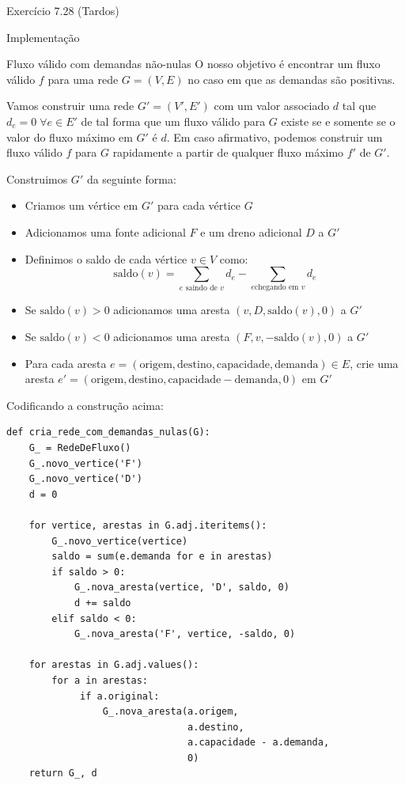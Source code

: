 \documentclass[presentation]{beamer}
\begin{document}
\begin{frame}[fragile,label=sec-2]{Exercício 7.28 (Tardos)}
\begin{block}{Implementação}
\begin{block}{Fluxo válido com demandas não-nulas}
O nosso objetivo é encontrar um fluxo válido $f$ para uma rede $G =
(V, E)$ no caso em que as demandas são positivas.

Vamos construir uma rede $G' = (V', E')$ com um valor associado $d$
tal que $d_e = 0 \; \forall e \in E'$ de tal forma que um fluxo válido
para $G$ existe se e somente se o valor do fluxo máximo em $G'$ é
$d$. Em caso afirmativo, podemos construir um fluxo válido $f$ para
$G$ rapidamente a partir de qualquer fluxo máximo $f'$ de $G'$.

Construimos $G'$ da seguinte forma:

\begin{itemize}
\item Criamos um vértice em $G'$ para cada vértice $G$
\item Adicionamos uma fonte adicional $F$ e um dreno adicional $D$ a $G'$
\item Definimos o saldo de cada vértice $v \in V$ como: \[
  \textrm{saldo}(v) = \sum_{e \text{ saindo de }v}d_e - \sum_{e \text{
  chegando em }v}d_e \]
\item Se $\mathrm{saldo}(v) > 0$ adicionamos uma aresta $(v, D,
  \mathrm{saldo}(v), 0)$ a $G'$
\item Se $\mathrm{saldo}(v) < 0$ adicionamos uma aresta $(F, v,
  -\mathrm{saldo}(v), 0)$ a $G'$
\item Para cada aresta $e = (\mathrm{origem, destino, capacidade,
  demanda}) \in E$, crie uma aresta $e' = (\mathrm{origem, destino,
  capacidade - demanda, 0})$ em $G'$
\end{itemize}

Codificando a construção acima:
\begin{verbatim}
def cria_rede_com_demandas_nulas(G):
    G_ = RedeDeFluxo()
    G_.novo_vertice('F')
    G_.novo_vertice('D')
    d = 0

    for vertice, arestas in G.adj.iteritems():
        G_.novo_vertice(vertice)
        saldo = sum(e.demanda for e in arestas)
        if saldo > 0:
            G_.nova_aresta(vertice, 'D', saldo, 0)
            d += saldo
        elif saldo < 0:
            G_.nova_aresta('F', vertice, -saldo, 0)

    for arestas in G.adj.values():
        for a in arestas:
             if a.original:
                 G_.nova_aresta(a.origem,
                                a.destino,
                                a.capacidade - a.demanda,
                                0)
    return G_, d
\end{verbatim}
\end{block}
\end{block}


\end{frame}
\end{document}
